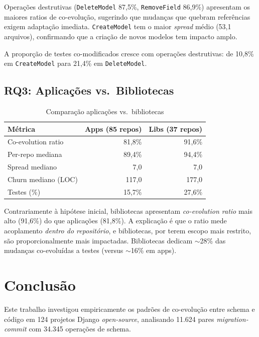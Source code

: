 \documentclass[
  12pt,
  openright,
  oneside,
  a4paper,
  brazil
]{abntex2}
\begin{document}
Operações destrutivas (\texttt{DeleteModel} 87,5\%, \texttt{RemoveField} 86,9\%) apresentam os maiores ratios de co-evolução, sugerindo que mudanças que quebram referências exigem adaptação imediata. \texttt{CreateModel} tem o maior \textit{spread} médio (53,1 arquivos), confirmando que a criação de novos modelos tem impacto amplo.

A proporção de testes co-modificados cresce com operações destrutivas: de 10,8\% em \texttt{CreateModel} para 21,4\% em \texttt{DeleteModel}.

\section{RQ3: Aplicações vs.\ Bibliotecas}

\begin{table}[htb]
\centering
\caption{Comparação aplicações vs.\ bibliotecas}
\label{tab:rq3}
\begin{tabular}{lrr}
\toprule
\textbf{Métrica} & \textbf{Apps (85 repos)} & \textbf{Libs (37 repos)} \\
\midrule
Co-evolution ratio & 81,8\% & 91,6\% \\
Per-repo mediana & 89,4\% & 94,4\% \\
Spread mediano & 7,0 & 7,0 \\
Churn mediano (LOC) & 117,0 & 177,0 \\
Testes (\%) & 15,7\% & 27,6\% \\
\bottomrule
\end{tabular}
\end{table}

Contrariamente à hipótese inicial, bibliotecas apresentam \textit{co-evolution ratio} mais alto (91,6\%) do que aplicações (81,8\%). A explicação é que o ratio mede acoplamento \textit{dentro do repositório}, e bibliotecas, por terem escopo mais restrito, são proporcionalmente mais impactadas. Bibliotecas dedicam $\sim$28\% das mudanças co-evoluídas a testes (versus $\sim$16\% em apps).


\chapter{Conclusão}\label{chap:conclusao}

Este trabalho investigou empiricamente os padrões de co-evolução entre schema e código em 124 projetos Django \textit{open-source}, analisando 11.624 pares \textit{migration-commit} com 34.345 operações de schema.
\end{document}
